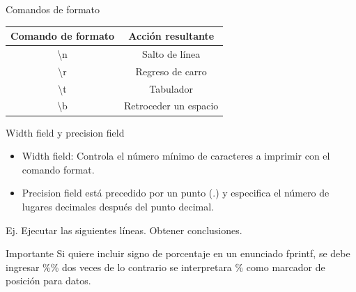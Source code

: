 \documentclass{bredelebeamer}
\begin{document}
\begin{frame}{Comandos de formato}
\begin{table}[]
\centering
\begin{tabular}{|c|c|}
\hline
Comando de formato & Acción resultante     \\ \hline
\textbackslash{}n  & Salto de línea        \\ \hline
\textbackslash{}r  & Regreso de carro      \\ \hline
\textbackslash{}t  & Tabulador             \\ \hline
\textbackslash{}b  & Retroceder un espacio \\ \hline
\end{tabular}
\end{table}
\end{frame}

\begin{frame}{Width field y precision field}
\begin{itemize}
\item Width field: Controla el número mínimo de caracteres a imprimir con el comando format.
\item Precision field está precedido por un punto (.) y especifica el número de lugares decimales después del punto decimal.
\end{itemize}
Ej. Ejecutar las siguientes líneas. Obtener conclusiones.

\begin{alertblock}{Importante}
Si quiere incluir signo de porcentaje en un enunciado fprintf, se debe ingresar \%\% dos veces de lo contrario se interpretara \% como marcador de posición para datos.
\end{alertblock}
\end{frame}



\end{document}
